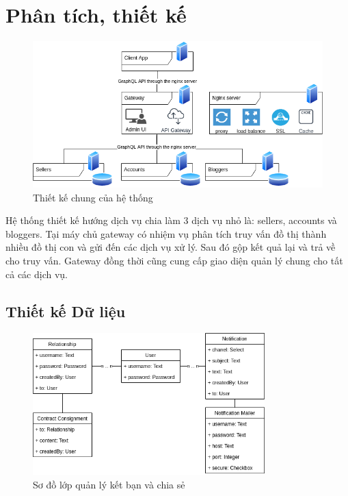 \documentclass[11pt]{report}
\begin{document}
	\section{Phân tích, thiết kế}\label{section:readme}
	\begin{figure}[h!]
		\begin{center}	
			\includegraphics[width=\textwidth]{srs}
			\caption{Thiết kế chung của hệ thống}
		\end{center}
	\end{figure}
	Hệ thống thiết kế hướng dịch vụ chia làm 3 dịch vụ nhỏ là: sellers, accounts và bloggers. Tại máy chủ gateway có nhiệm vụ phân tích truy vấn đồ thị thành nhiều đồ thị con và gửi đến các dịch vụ xử lý. Sau đó gộp kết quả lại và trả về cho truy vấn. Gateway đồng thời cũng cung cấp giao diện quản lý chung cho tất cả các dịch vụ.
	
	
	
	
	
		\clearpage
	\subsection{Thiết kế Dữ liệu}




\FloatBarrier
\begin{figure}[!htbp]
	\centering
	\includegraphics[width=0.8\textwidth]{class-accounts}
	\caption{Sơ đồ lớp quản lý kết bạn và chia sẻ}
\end{figure}
\end{document}
